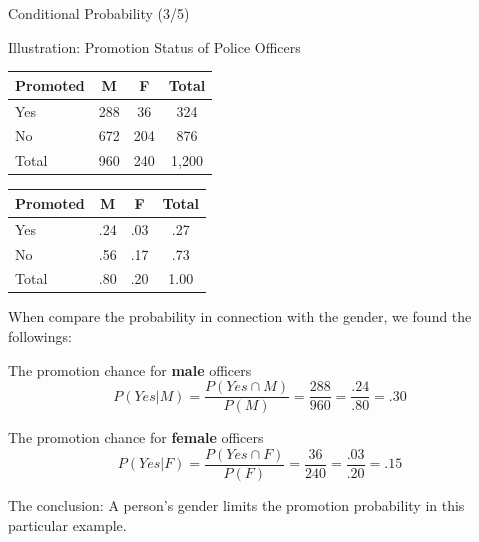 \documentclass{beamer}
\begin{document}
\begin{frame}{Conditional Probability (3/5)}
\begin{small}

\begin{center}
Illustration: Promotion Status of Police Officers
\end{center}

\begin{multicols}{2}

\begin{small}
\begin{center}
\begin{tabular}{l|c|c|c}
\hline 
Promoted & M & F & Total \\ 
\hline 
Yes & 288 & 36 & 324 \\ 
\hline 
No & 672 & 204 & 876 \\ 
\hline 
Total & 960 & 240 & 1,200 \\ 
\hline 
\end{tabular}
\end{center}

\begin{center}
\begin{tabular}{l|c|c|c}
\hline 
Promoted & M & F & Total \\ 
\hline 
Yes & .24 & .03 & .27 \\ 
\hline 
No & .56 & .17 & .73 \\ 
\hline 
Total & .80 & .20 & 1.00 \\ 
\hline 
\end{tabular}
\end{center}
\end{small}
\end{multicols}

When compare the probability in connection with the gender, we found the followings:

\vspace{0.3 cm} 


The promotion chance for \textbf{male} officers
$$P(Yes|M) = \frac{P(Yes \cap M)}{P(M)} = \frac{288}{960} = \frac{.24}{.80} = .30$$

The promotion chance for \textbf{female} officers
$$P(Yes|F) = \frac{P(Yes \cap F)}{P(F)} = \frac{36}{240} = \frac{.03}{.20} = .15$$


The conclusion: A person's gender limits the promotion probability in this particular example.
\end{small}
\end{frame}
\end{document}
